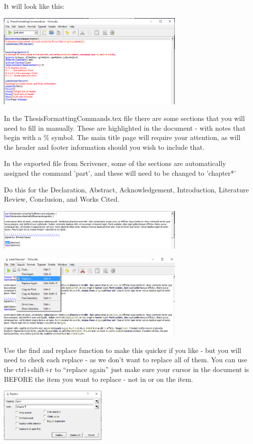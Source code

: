 \documentclass{article}
\begin{document}
It will look like this:

\includegraphics[width=350px]{images/tex002.PNG}

In the ThesisFormattingCommands.tex file there are some sections that you will need to fill in manually. These are highlighted in the document - with notes that begin with a \% symbol. The main title page will require your attention, as will the header and footer information should you wish to include that.


In the exported file from Scrivener, some of the sections are automatically assigned the command 'part', and these will need to be changed to 'chapter*'

Do this for the Declaration, Abstract, Acknowledgement, Introduction, Literature Review, Conclusion, and Works Cited. 

\includegraphics[width=350px]{images/tex003.PNG}

\includegraphics[width=350px]{images/tex004.PNG}

Use the find and replace function to make this quicker if you like - but you will need to check each replace - as we don't want to replace all of them. You can use the ctrl+shift+r to ``replace again'' just make sure your cursor in the document is BEFORE the item you want to replace - not in or on the item. 

\includegraphics[width=200px]{images/tex005.PNG}
\end{document}
